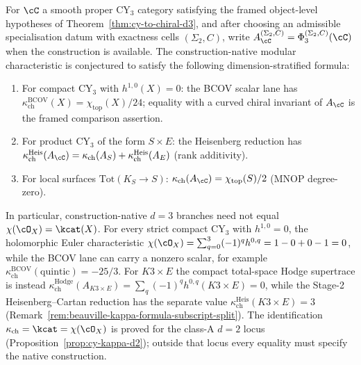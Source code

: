 \begin{conjecture}[CY modular characteristic at \texorpdfstring{$d = 3$}{d = 3}: dimension-stratified formula]
\label{conj:cy-kappa-identification}
\ClaimStatusConjectured
For $\cC$ a smooth proper CY$_3$ category satisfying the framed object-level hypotheses of Theorem~\ref{thm:cy-to-chiral-d3}, and after choosing an admissible specialisation datum with exactness cells $(\Sigma_2,C)$, write $A_\cC^{(\Sigma_2,C)}=\Phi_3^{(\Sigma_2,C)}(\cC)$ when the construction is available. The construction-native modular characteristic is conjectured to satisfy the following dimension-stratified formula:
\begin{enumerate}[label=\textup{(\roman*)}]
 \item For compact CY$_3$ with $h^{1,0}(X) = 0$: the BCOV scalar lane has $\kappa_{\mathrm{ch}}^{\mathrm{BCOV}}(X) = \chi_{\mathrm{top}}(X) / 24$; equality with a curved chiral invariant of $A_\cC$ is the framed comparison assertion.
 \item For product CY$_3$ of the form $S \times E$: the Heisenberg reduction has $\kappa_{\mathrm{ch}}^{\mathrm{Heis}}(A_\cC) = \kappa_{\mathrm{ch}}(A_S) + \kappa_{\mathrm{ch}}^{\mathrm{Heis}}(A_E)$ \textup{(}rank additivity\textup{)}.
 \item For local surfaces $\mathrm{Tot}(K_S \to S)$: $\kappa_{\mathrm{ch}}(A_\cC) = \chi_{\mathrm{top}}(S) / 2$ \textup{(}MNOP degree-zero\textup{)}.
\end{enumerate}
In particular, construction-native $d=3$ branches need not equal $\chi(\cO_X) = \kcat(X)$. For every strict compact CY$_3$ with $h^{1,0} = 0$, the holomorphic Euler characteristic $\chi(\cO_X) = \sum_{q=0}^{3} (-1)^q h^{0,q} = 1 - 0 + 0 - 1 = 0$, while the BCOV lane can carry a nonzero scalar, for example $\kappa_{\mathrm{ch}}^{\mathrm{BCOV}}(\text{quintic}) = -25/3$. For $K3 \times E$ the compact total-space Hodge supertrace is instead $\kappa_{\mathrm{ch}}^{\mathrm{Hodge}}(A_{K3 \times E}) = \sum_q(-1)^q h^{0,q}(K3 \times E) = 0$, while the Stage-2 Heisenberg--Cartan reduction has the separate value $\kappa_{\mathrm{ch}}^{\mathrm{Heis}}(K3 \times E) = 3$ (Remark~\ref{rem:beauville-kappa-formula-subscript-split}). The identification $\kappa_{\mathrm{ch}} = \kcat = \chi(\cO_X)$ is proved for the class-A $d = 2$ locus (Proposition~\textup{\ref{prop:cy-kappa-d2}}); outside that locus every equality must specify the native construction.
\end{conjecture}

